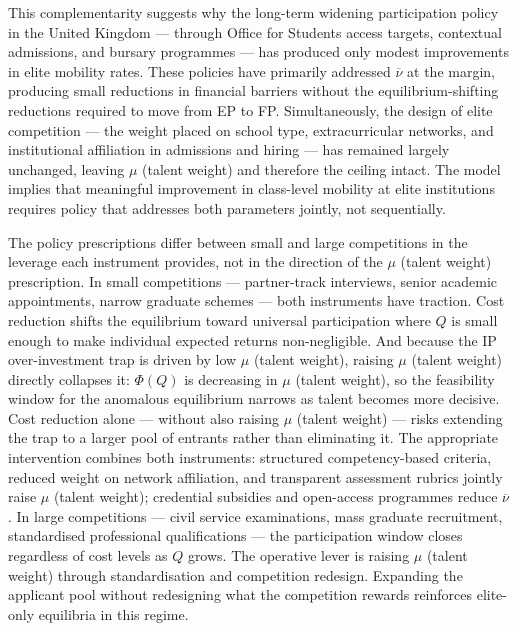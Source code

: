 \documentclass[
    oneside,
    fontsize=10pt,leqno]{article}
\begin{document}
This complementarity suggests why
the long-term widening participation policy in the United Kingdom
--- through Office for Students access targets, contextual
admissions, and bursary programmes --- has produced only modest
improvements in elite mobility rates. These policies have
primarily addressed $\overline{\nu}$ at the margin, producing
small reductions in financial barriers without the equilibrium-shifting
reductions required to move from EP to FP. Simultaneously,
the design of elite competition --- the weight placed on school
type, extracurricular networks, and institutional affiliation
in admissions and hiring --- has remained largely unchanged,
leaving $\mu$ (talent weight) and therefore the ceiling intact. The model
implies that meaningful improvement in class-level mobility at
elite institutions requires policy that addresses both parameters
jointly, not sequentially.

The policy prescriptions differ between small and large competitions
in the leverage each instrument provides, not in the direction of
the $\mu$ (talent weight) prescription. In small competitions --- partner-track interviews,
senior academic appointments, narrow graduate schemes --- both
instruments have traction. Cost reduction shifts the equilibrium
toward universal participation where $Q$ is small enough to make
individual expected returns non-negligible. And because the IP
over-investment trap is driven by low $\mu$ (talent weight), raising $\mu$ (talent weight) directly
collapses it: $\Phi(Q)$ is decreasing in $\mu$ (talent weight), so the feasibility
window for the anomalous equilibrium narrows as talent becomes more
decisive. Cost reduction alone --- without also raising $\mu$ (talent weight) ---
risks extending the trap to a larger pool of entrants rather than
eliminating it. The appropriate intervention combines both instruments:
structured competency-based criteria, reduced weight on network
affiliation, and transparent assessment rubrics jointly raise $\mu$ (talent weight);
credential subsidies and open-access programmes reduce $\overline{\nu}$.
In large competitions ---
civil service examinations, mass graduate recruitment,
standardised professional qualifications --- the participation
window closes regardless of cost levels as $Q$ grows. The
operative lever is raising $\mu$ (talent weight) through standardisation and
competition redesign. Expanding the applicant pool without
redesigning what the competition rewards reinforces elite-only
equilibria in this regime.
\end{document}
